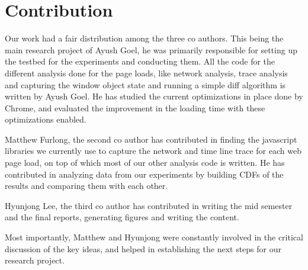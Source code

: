 \section{Contribution}
\label{sec:contribution}

Our work had a fair distribution among the three co authors. 
This being the main research project of Ayush Goel, he was primarily 
responsible for setting up the testbed for the experiments and conducting them. 
All the code for the different analysis done for the page loads, like network
analysis, trace analysis and capturing the window object state and running
a simple diff algorithm is written by Ayush Goel. He has studied the current 
optimizations in place done by Chrome, and evaluated the improvement in the
loading time with these optimizations enabled. 

Matthew Furlong, the second co author has contributed in finding 
the javascript libraries we currently use to capture the network
and time line trace for each web page load, on top of which most of 
our other analysis code is written. He has contributed in analyzing
data from our experiments by building CDFs of the results and 
comparing them with each other. 

Hyunjong Lee, the third co author has contributed in writing the mid semester
and the final reports, generating figures and writing the content. 

Most importantly, Matthew and Hyunjong were constantly involved in the
critical discussion of the key ideas, and helped in establishing the next
steps for our research project. 